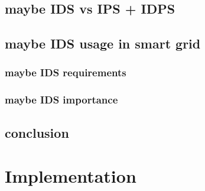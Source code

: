 \section{maybe IDS vs IPS + IDPS}

\section{maybe IDS usage in smart grid}

\subsection{maybe IDS requirements}

\subsection{maybe IDS importance}


\section{conclusion}













\chapter{Implementation} \label{chap:Implementation}
